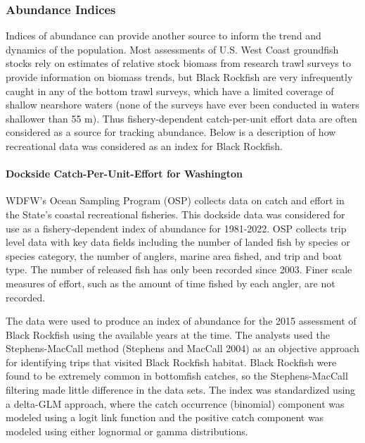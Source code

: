 \documentclass[11pt,
  english,
  letterpaper,
]{article}
\begin{document}
\hypertarget{abundance-indices}{%
\subsubsection{Abundance Indices}\label{abundance-indices}}

Indices of abundance can provide another source to inform the trend and dynamics of the population. Most assessments of U.S. West Coast groundfish stocks rely on estimates of relative stock biomass from research trawl surveys to provide information on biomass trends, but Black Rockfish are very infrequently caught in any of the bottom trawl surveys, which have a limited coverage of shallow nearshore waters (none of the surveys have ever been conducted in waters shallower than 55 m). Thus fishery-dependent catch-per-unit effort data are often considered as a source for tracking abundance. Below is a description of how recreational data was considered as an index for Black Rockfish.

\hypertarget{dockside-catch-per-unit-effort-for-washington}{%
\paragraph{Dockside Catch-Per-Unit-Effort for Washington}\label{dockside-catch-per-unit-effort-for-washington}}

WDFW's Ocean Sampling Program (OSP) collects data on catch and effort in the State's coastal recreational fisheries. This dockside data was considered for use as a fishery-dependent index of abundance for 1981-2022. OSP collects trip level data with key data fields including the number of landed fish by species or species category, the number of anglers, marine area fished, and trip and boat type. The number of released fish has only been recorded since 2003. Finer scale measures of effort, such as the amount of time fished by each angler, are not recorded.

The data were used to produce an index of abundance for the 2015 assessment of Black Rockfish using the available years at the time. The analysts used the Stephens-MacCall method (Stephens and MacCall 2004) as an objective approach for identifying trips that visited Black Rockfish habitat. Black Rockfish were found to be extremely common in bottomfish catches, so the Stephens-MacCall filtering made little difference in the data sets. The index was standardized using a delta-GLM approach, where the catch occurrence (binomial) component was modeled using a logit link function and the positive catch component was modeled using either lognormal or gamma distributions.
\end{document}
